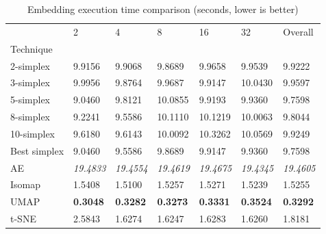 \begin{table}
\caption{Embedding execution time comparison (seconds, lower is better)}
\label{tab:results_embed_time}
\begin{center}
\begin{tabular}{lllllll}
\toprule
 & 2 & 4 & 8 & 16 & 32 & Overall \\
Technique &  &  &  &  &  &  \\
\midrule
2-simplex & 9.9156 & 9.9068 & 9.8689 & 9.9658 & 9.9539 & 9.9222 \\
3-simplex & 9.9956 & 9.8764 & 9.9687 & 9.9147 & 10.0430 & 9.9597 \\
5-simplex & 9.0460 & 9.8121 & 10.0855 & 9.9193 & 9.9360 & 9.7598 \\
8-simplex & 9.2241 & 9.5586 & 10.1110 & 10.1219 & 10.0063 & 9.8044 \\
10-simplex & 9.6180 & 9.6143 & 10.0092 & 10.3262 & 10.0569 & 9.9249 \\
Best simplex & 9.0460 & 9.5586 & 9.8689 & 9.9147 & 9.9360 & 9.7598 \\
AE & \textit{19.4833} & \textit{19.4554} & \textit{19.4619} & \textit{19.4675} & \textit{19.4345} & \textit{19.4605} \\
Isomap & 1.5408 & 1.5100 & 1.5257 & 1.5271 & 1.5239 & 1.5255 \\
UMAP & \textbf{0.3048} & \textbf{0.3282} & \textbf{0.3273} & \textbf{0.3331} & \textbf{0.3524} & \textbf{0.3292} \\
t-SNE & 2.5843 & 1.6274 & 1.6247 & 1.6283 & 1.6260 & 1.8181 \\
\bottomrule
\end{tabular}
\end{center}
\end{table}
